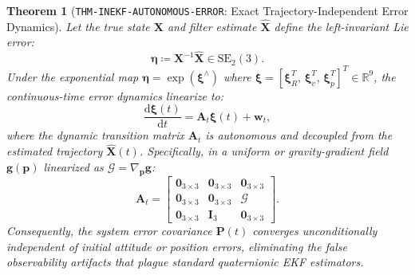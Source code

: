 \documentclass[11pt,a4paper,reqno]{article}
\theoremstyle{plain}
\newtheorem{theorem}{Theorem}[section]
\theoremstyle{definition}
\theoremstyle{remark}
\numberwithin{equation}{section}
\numberwithin{table}{section}
\providecommand{\diff}{\mathrm{d}}
\begin{document}
\begin{theorem}[\texttt{THM-INEKF-AUTONOMOUS-ERROR}: Exact Trajectory-Independent Error Dynamics]
\label{thm:inekf_autonomous_error}
Let the true state $\bm{X}$ and filter estimate $\widehat{\bm{X}}$ define the left-invariant Lie error:
\begin{equation}
  \bm{\eta} \coloneqq \bm{X}^{-1} \widehat{\bm{X}} \in \mathrm{SE}_2(3).
\end{equation}
Under the exponential map $\bm{\eta} = \exp(\bm{\xi}^\wedge)$ where $\bm{\xi} = [\bm{\xi}_R^T, \, \bm{\xi}_v^T, \, \bm{\xi}_p^T]^T \in \mathbb{R}^9$, the continuous-time error dynamics linearize to:
\begin{equation}
  \frac{\diff \bm{\xi}(t)}{\diff t} = \bm{A}_t \bm{\xi}(t) + \bm{w}_t,
  \label{eq:inekf_error_linearization}
\end{equation}
where the dynamic transition matrix $\bm{A}_t$ is \emph{autonomous} and decoupled from the estimated trajectory $\widehat{\bm{X}}(t)$. Specifically, in a uniform or gravity-gradient field $\bm{g}(\bm{p})$ linearized as $\bm{\mathcal{G}} = \nabla_{\bm{p}} \bm{g}$:
\begin{equation}
  \bm{A}_t = \begin{bmatrix}
    \bm{0}_{3 \times 3} & \bm{0}_{3 \times 3} & \bm{0}_{3 \times 3} \\
    \bm{0}_{3 \times 3} & \bm{0}_{3 \times 3} & \bm{\mathcal{G}} \\
    \bm{0}_{3 \times 3} & \bm{I}_3 & \bm{0}_{3 \times 3}
  \end{bmatrix}.
\end{equation}
Consequently, the system error covariance $\bm{P}(t)$ converges unconditionally independent of initial attitude or position errors, eliminating the false observability artifacts that plague standard quaternionic EKF estimators.
\end{theorem}
\end{document}
